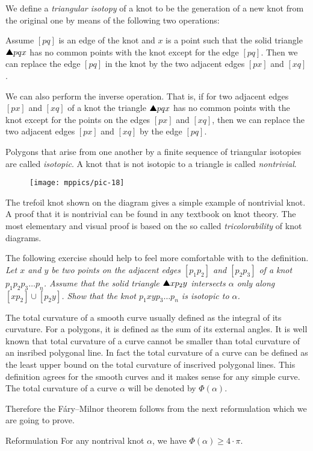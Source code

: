 We define a \emph{triangular isotopy} of a knot to be the generation of a new knot from the original one by means of the
following two operations:

Assume $[pq]$ is an edge of the knot and $x$
is a point such that the solid triangle $\solidtriangle pqx$  has no common points with the knot except for the edge $[pq]$.
Then we can replace the edge $[pq]$ in the knot by the two adjacent edges $[px]$ and $[xq]$.

We can also perform the inverse operation.
That is, if for two adjacent edges $[px]$ and $[xq]$ of a knot the triangle
$\solidtriangle pqx$ has no common points with the knot except for the points on the edges $[px]$ and $[xq]$,
then we can replace the two adjacent edges $[px]$ and $[xq]$ by the edge $[pq]$.

Polygons that arise from one another by a finite sequence of
triangular isotopies are called \emph{isotopic}.
A knot that is not isotopic to a triangle is called \emph{nontrivial}.

\begin{wrapfigure}{r}{22 mm}
\vskip-4mm
\centering
\texttt{[image: mppics/pic-18]}
\vskip0mm
\end{wrapfigure}

The trefoil knot shown on the diagram gives a simple example of nontrivial knot.
A proof that it is nontrivial can be found in any textbook on knot theory.
The most elementary and visual proof is based on the so called \emph{tricolorability} of knot diagrams.

The following exercise should help to feel more comfortable with to the definition.
\textit{Let $x$ and $y$ be two points on the adjacent edges $[p_1p_2]$ and $[p_2p_3]$ of a knot $p_1p_2p_3\dots p_n$.
Assume that the solid triangle $\solidtriangle xp_2y$ intersects $\alpha$ only along $[xp_2]\cup [p_2y]$.
Show that the knot $p_1xyp_3\dots p_n$ is isotopic to $\alpha$.}

The total curvature of a smooth curve usually defined as the integral of its curvature.
For a polygons, it is defined as the sum of its external angles.
It is well known that total curvature of a curve cannot be smaller than total curvature of an insribed polygonal line.
In fact the total curvature of a curve can be defined as the least upper bound on the total curvature of inscrived polygonal lines.
This definition agrees for the smooth curves and it makes sense for any simple curve.
The total curvature of a curve $\alpha$ will be denoted by $\Phi(\alpha)$.

Therefore the F\'ary--Milnor theorem follows from the next reformulation which we are going to prove.

\begin{thm}{Reformulation}\label{thm:fary-milnor}
For any nontrival knot $\alpha$, we have $\Phi(\alpha)\ge 4\cdot\pi$. 
\end{thm} 



